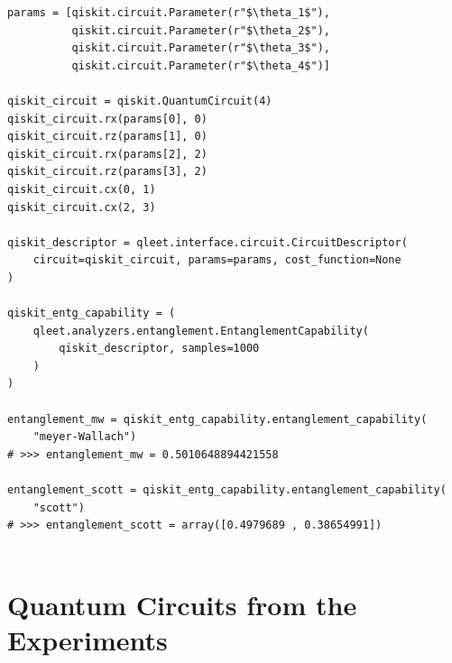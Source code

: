 \begin{lstlisting}
params = [qiskit.circuit.Parameter(r"$\theta_1$"), 
          qiskit.circuit.Parameter(r"$\theta_2$"), 
          qiskit.circuit.Parameter(r"$\theta_3$"), 
          qiskit.circuit.Parameter(r"$\theta_4$")]

qiskit_circuit = qiskit.QuantumCircuit(4)
qiskit_circuit.rx(params[0], 0)
qiskit_circuit.rz(params[1], 0)
qiskit_circuit.rx(params[2], 2)
qiskit_circuit.rz(params[3], 2)
qiskit_circuit.cx(0, 1)
qiskit_circuit.cx(2, 3)

qiskit_descriptor = qleet.interface.circuit.CircuitDescriptor(
    circuit=qiskit_circuit, params=params, cost_function=None
)

qiskit_entg_capability = (
    qleet.analyzers.entanglement.EntanglementCapability(
        qiskit_descriptor, samples=1000
    )
)

entanglement_mw = qiskit_entg_capability.entanglement_capability(
    "meyer-Wallach")
# >>> entanglement_mw = 0.5010648894421558

entanglement_scott = qiskit_entg_capability.entanglement_capability(
    "scott")
# >>> entanglement_scott = array([0.4979689 , 0.38654991])


\end{lstlisting}

\section{Quantum Circuits from the Experiments}


